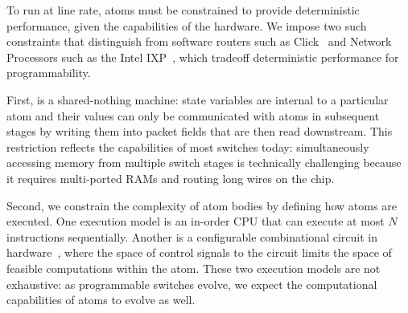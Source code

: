 \smallskip
{} To run at line rate, atoms must
be constrained to provide deterministic performance, given the
capabilities of the hardware. We impose two such constraints that
distinguish \absmachine from software routers such as
Click~\cite{click} and Network Processors such as the Intel
IXP~\cite{ixp4xx}, which tradeoff deterministic performance for
programmability.

First, \absmachine is a shared-nothing machine: state variables are
internal to a particular atom and their values can only be
communicated with atoms in subsequent stages by writing them into
packet fields that are then read downstream.  This restriction
reflects the capabilities of most switches today: simultaneously
accessing memory from multiple switch stages is technically
challenging because it requires multi-ported RAMs and routing long
wires on the chip.


Second, we constrain the complexity of atom bodies by defining how
atoms are executed. One execution model is an in-order CPU that can
execute at most $N$ instructions sequentially. Another is a
configurable combinational circuit in hardware~\cite{dataflow}, where
the space of control signals to the circuit limits the space of
feasible computations within the atom. These two execution models are
not exhaustive: as programmable switches evolve, we expect the
computational capabilities of atoms to evolve as well.


